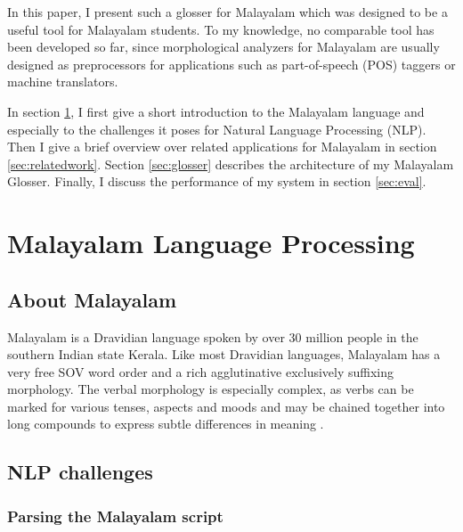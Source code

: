 \documentclass[a4paper]{article}
\begin{document}
In this paper, I present such a glosser for Malayalam which was designed to be a useful tool for Malayalam students. To my knowledge, no comparable tool has been developed so far, since morphological analyzers for Malayalam are usually designed as preprocessors for applications such as part-of-speech (POS) taggers or machine translators.

In section \ref{sec:malnlp}, I first give a short introduction to the Malayalam language and especially to the challenges it poses for Natural Language Processing (NLP). Then I give a brief overview over related applications for Malayalam in section \ref{sec:relatedwork}. Section \ref{sec:glosser} describes the architecture of my Malayalam Glosser. Finally, I discuss the performance of my system in section \ref{sec:eval}.

\section{Malayalam Language Processing}\label{sec:malnlp}

\subsection{About Malayalam}

Malayalam is a Dravidian language spoken by over 30 million people in the southern Indian state Kerala. Like most Dravidian languages, Malayalam has a very free SOV word order and a rich agglutinative exclusively suffixing morphology. The verbal morphology is especially complex, as verbs can be marked for various tenses, aspects and moods and may be chained together into long compounds to express subtle differences in meaning \parencite{asherKumari}.

\subsection{NLP challenges}

\subsubsection{Parsing the Malayalam script}
\end{document}
